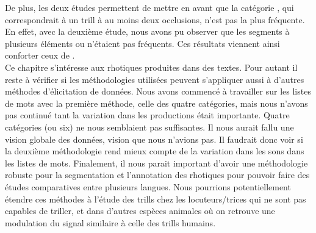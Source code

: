 De plus, les deux études permettent de mettre en avant que la catégorie , qui correspondrait à un trill à au moins deux occlusions, n'est pas la plus fréquente.
En effet, avec la deuxième étude, nous avons pu observer que les segments à plusieurs éléments  ou  n'étaient pas fréquents. Ces résultats viennent ainsi conforter ceux de \textcite{lindauStory1985}.\\

Ce chapitre s'intéresse aux rhotiques produites dans des textes. Pour autant il reste à vérifier si les méthodologies utilisées peuvent s'appliquer aussi à d'autres méthodes d'élicitation de données. Nous avons commencé à travailler sur les listes de mots avec la première méthode, celle des quatre catégories, mais nous n'avons pas continué tant la variation dans les productions était importante. Quatre catégories (ou six) ne nous semblaient pas suffisantes. Il nous aurait fallu une vision globale des données, vision que nous n'avions pas. Il faudrait donc voir si la deuxième méthodologie rend mieux compte de la variation dans les sons  dans les listes de mots.
Finalement, il nous parait important d'avoir une méthodologie robuste pour la segmentation et l'annotation des rhotiques pour pouvoir faire des études comparatives entre plusieurs langues. Nous pourrions potentiellement étendre ces méthodes à l'étude des trills chez les locuteurs/trices qui ne sont pas capables de triller, et dans d'autres espèces animales où on retrouve une modulation du signal similaire à celle des trills humains.

